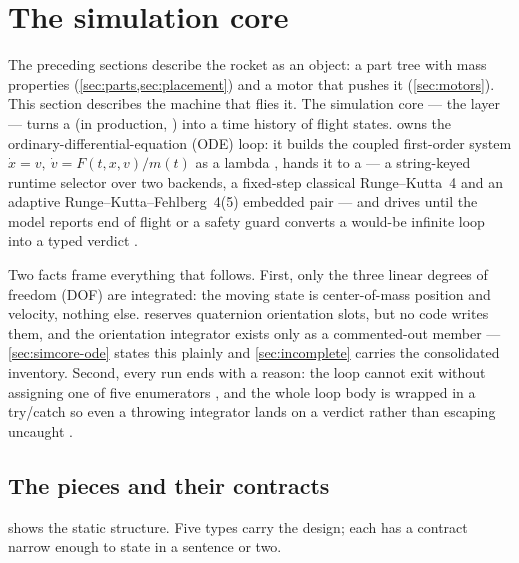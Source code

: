 \section{The simulation core}\label{sec:simcore}

The preceding sections describe the rocket as an object: a part tree with mass properties
(\cref{sec:parts,sec:placement}) and a motor that pushes it (\cref{sec:motors}). This section
describes the machine that flies it. The simulation core --- the  layer --- turns a
 (in production, ) into a time history of flight
states.  owns the ordinary-differential-equation (ODE) loop: it builds the
coupled first-order system $\dot{x}=v,\ \dot{v}=F(t,x,v)/m(t)$ as a lambda
, hands it to a  --- a string-keyed runtime
selector over two  backends, a fixed-step classical Runge--Kutta~4 and an
adaptive Runge--Kutta--Fehlberg~4(5) embedded pair  --- and drives
 until the model reports end of flight or a safety guard converts a
would-be infinite loop into a typed verdict .

Two facts frame everything that follows. First, only the three linear degrees of freedom (DOF)
are integrated: the moving state is center-of-mass position and velocity, nothing else.
 reserves quaternion orientation slots, but no code writes them, and the
orientation integrator exists only as a commented-out member  ---
\cref{sec:simcore-ode} states this plainly and \cref{sec:incomplete} carries the consolidated
inventory. Second, every run ends with a reason: the loop cannot exit without assigning one of
five  enumerators , and the whole loop body is
wrapped in a try/catch so even a throwing integrator lands on a verdict rather than escaping
uncaught .

\subsection{The pieces and their contracts}\label{sec:simcore-pieces}

 shows the static structure. Five types carry the design; each has a
contract narrow enough to state in a sentence or two.


